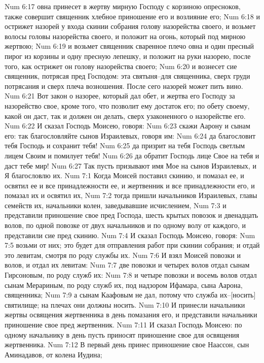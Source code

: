 Num 6:17  овна принесет в жертву мирную Господу с корзиною опресноков, также совершит священник хлебное приношение его и возлияние его;
Num 6:18  и острижет назорей у входа скинии собрания голову назорейства своего, и возьмет волосы головы назорейства своего, и положит на огонь, который под мирною жертвою;
Num 6:19  и возьмет священник сваренное плечо овна и один пресный пирог из корзины и одну пресную лепешку, и положит на руки назорею, после того, как острижет он голову назорейства своего;
Num 6:20  и вознесет сие священник, потрясая пред Господом: эта святыня--для священника, сверх груди потрясания и сверх плеча возношения. После сего назорей может пить вино.
Num 6:21  Вот закон о назорее, который дал обет, и жертва его Господу за назорейство свое, кроме того, что позволит ему достаток его; по обету своему, какой он даст, так и должен он делать, сверх узаконенного о назорействе его.
Num 6:22  И сказал Господь Моисею, говоря:
Num 6:23  скажи Аарону и сынам его: так благословляйте сынов Израилевых, говоря им:
Num 6:24  да благословит тебя Господь и сохранит тебя!
Num 6:25  да призрит на тебя Господь светлым лицем Своим и помилует тебя!
Num 6:26  да обратит Господь лице Свое на тебя и даст тебе мир!
Num 6:27  Так пусть призывают имя Мое на сынов Израилевых, и Я благословлю их.
Num 7:1  Когда Моисей поставил скинию, и помазал ее, и освятил ее и все принадлежности ее, и жертвенник и все принадлежности его, и помазал их и освятил их,
Num 7:2  тогда пришли начальников Израилевых, главы семейств их, начальники колен, заведывавшие исчислением,
Num 7:3  и представили приношение свое пред Господа, шесть крытых повозок и двенадцать волов, по одной повозке от двух начальников и по одному волу от каждого, и представили сие пред скинию.
Num 7:4  И сказал Господь Моисею, говоря:
Num 7:5  возьми от них; это будет для отправления работ при скинии собрания; и отдай это левитам, смотря по роду службы их.
Num 7:6  И взял Моисей повозки и волов, и отдал их левитам:
Num 7:7  две повозки и четырех волов отдал сынам Гирсоновым, по роду служб их:
Num 7:8  и четыре повозки и восемь волов отдал сынам Мерариным, по роду служб их, под надзором Ифамара, сына Аарона, священника;
Num 7:9  а сынам Каафовым не дал, потому что служба их--[носить] святилище; на плечах они должны носить.
Num 7:10  И принесли начальники жертвы освящения жертвенника в день помазания его, и представили начальники приношение свое пред жертвенник.
Num 7:11  И сказал Господь Моисею: по одному начальнику в день пусть приносят приношение свое для освящения жертвенника.
Num 7:12  В первый день принес приношение свое Наассон, сын Аминадавов, от колена Иудина;
